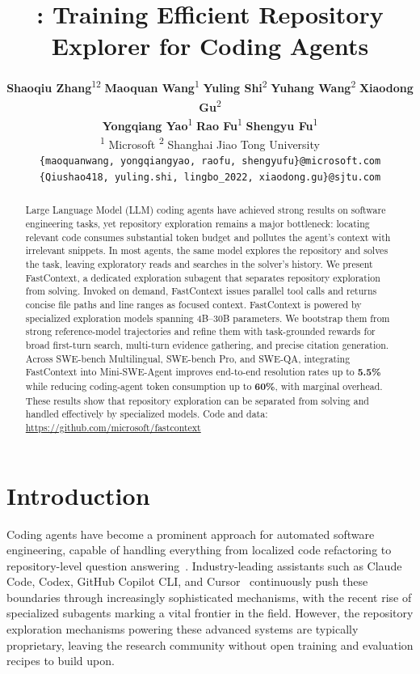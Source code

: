 \documentclass[11pt]{article}
\title{\approach: Training Efficient Repository Explorer for Coding Agents}
\author{
\textbf{Shaoqiu Zhang}\textsuperscript{1}\textsuperscript{2}\footnotemark[1]\footnotemark[2] \hspace{.1cm} 
\textbf{Maoquan Wang}\textsuperscript{1}\footnotemark[1] \hspace{.1cm}
\textbf{Yuling Shi}\textsuperscript{2}\footnotemark[1] \hspace{.1cm}
\textbf{Yuhang Wang}\textsuperscript{2} \hspace{.1cm}
\textbf{Xiaodong Gu}\textsuperscript{2} \hspace{.1cm}\\
\textbf{Yongqiang Yao}\textsuperscript{1}
\textbf{Rao Fu}\textsuperscript{1}
\textbf{Shengyu Fu}\textsuperscript{1}\footnotemark[3] \\
\textsuperscript{1} Microsoft \hspace{.1cm} \textsuperscript{2} Shanghai Jiao Tong University\\
\texttt{\{maoquanwang, yongqiangyao, raofu, shengyufu\}@microsoft.com}\\
\texttt{\{Qiushao418, yuling.shi, lingbo\_2022, xiaodong.gu\}@sjtu.com}
}
\newcommand{\approach}{{FastContext}\xspace}
\begin{document}
\maketitle


\begin{abstract}
Large Language Model (LLM) coding agents have achieved strong results on software engineering tasks, yet repository exploration remains a major bottleneck: locating relevant code consumes substantial token budget and pollutes the agent's context with irrelevant snippets.
%
In most agents, the same model explores the repository and solves the task, leaving exploratory reads and searches in the solver's history.
We present \approach, a dedicated exploration subagent that separates repository exploration from solving.
Invoked on demand, \approach issues parallel tool calls and returns concise file paths and line ranges as focused context.
%
\approach is powered by specialized exploration models spanning 4B--30B parameters.
We bootstrap them from strong reference-model trajectories and refine them with task-grounded rewards for broad first-turn search, multi-turn evidence gathering, and precise citation generation.
%
Across SWE-bench Multilingual, SWE-bench Pro, and SWE-QA, integrating \approach into Mini-SWE-Agent improves end-to-end resolution rates up to \textbf{5.5\%} while reducing coding-agent token consumption up to \textbf{60\%}, with marginal overhead.
These results show that repository exploration can be separated from solving and handled effectively by specialized models. Code and data: \url{https://github.com/microsoft/fastcontext}

\begingroup
\renewcommand{\thefootnote}{\fnsymbol{footnote}}
\setcounter{footnote}{0}
\endgroup
\end{abstract}

\section{Introduction}
\label{sec:intro}

Coding agents have become a prominent approach for automated software engineering, capable of handling everything from localized code refactoring to repository-level question answering~\cite{sweagent, autocoderover, agentless, openhands}. Industry-leading assistants such as Claude Code, Codex, GitHub Copilot CLI, and Cursor~\cite{claudecode, openaicodex, githubcopilotcli, cursor} continuously push these boundaries through increasingly sophisticated mechanisms, with the recent rise of specialized subagents marking a vital frontier in the field. However, the repository exploration mechanisms powering these advanced systems are typically proprietary, leaving the research community without open training and evaluation recipes to build upon.
\end{document}
